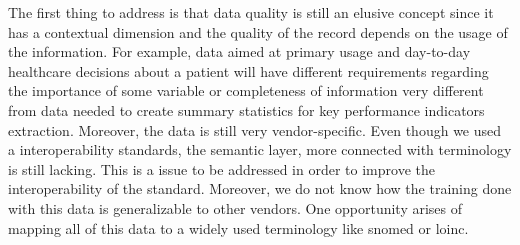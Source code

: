 The first thing to address is that data quality is still an elusive concept since it has a contextual dimension and the quality of the record depends on the usage of the information. For example, data aimed at primary usage and day-to-day healthcare decisions about a patient will have different requirements regarding the importance of some variable or completeness of information very different from data needed to create summary statistics for key performance indicators extraction. 
Moreover, the data is still very vendor-specific. Even though we used a interoperability standards, the semantic layer, more connected with terminology is still lacking. This is a issue to be addressed in order to improve the interoperability of the standard. Moreover, we do not know how the training done with this data is generalizable to other vendors. One opportunity arises of mapping all of this data to a widely used terminology like snomed or loinc.

